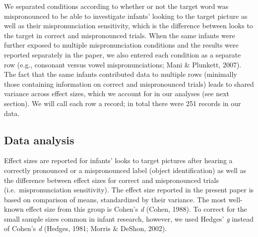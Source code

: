 \documentclass[man]{apa6}
\theoremstyle{definition}
\theoremstyle{definition}
\theoremstyle{definition}
\theoremstyle{remark}
\begin{document}
We separated conditions according to whether or not the target word was
mispronounced to be able to investigate infants' looking to the target
picture as well as their mispronunciation sensitivity, which is the
difference between looks to the target in correct and mispronounced
trials. When the same infants were further exposed to multiple
mispronunciation conditions and the results were reported separately in
the paper, we also entered each condition as a separate row (e.g.,
consonant versus vowel mispronunciations; Mani \& Plunkett, 2007). The
fact that the same infants contributed data to multiple rows (minimally
those containing information on correct and mispronounced trials) leads
to shared variance across effect sizes, which we account for in our
analyses (see next section). We will call each row a record; in total
there were 251 records in our data.

\subsection{Data analysis}\label{data-analysis}

Effect sizes are reported for infants' looks to target pictures after
hearing a correctly pronounced or a mispronounced label (object
identification) as well as the difference between effect sizes for
correct and mispronounced trials (i.e.~mispronunciation sensitivity).
The effect size reported in the present paper is based on comparison of
means, standardized by their variance. The most well-known effect size
from this group is Cohen's \emph{d} (Cohen, 1988). To correct for the
small sample sizes common in infant research, however, we used Hedges'
\emph{g} instead of Cohen's \emph{d} (Hedges, 1981; Morris \& DeShon,
2002).
\end{document}
